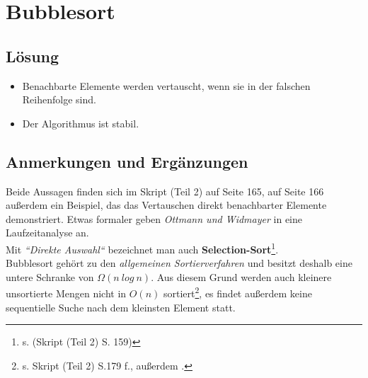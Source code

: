 \chapter{Bubblesort}

\section*{Lösung}

\begin{itemize}
    \item Benachbarte Elemente werden vertauscht, wenn sie in der falschen Reihenfolge sind.
    \item Der Algorithmus ist stabil.
\end{itemize}



\section*{Anmerkungen und Ergänzungen}

Beide Aussagen finden sich im Skript (Teil 2) auf Seite 165, auf Seite 166 außerdem ein Beispiel, das das Vertauschen direkt benachbarter Elemente demonstriert.
Etwas formaler geben \textit{Ottmann und Widmayer} in \cite[89 ff.]{OW17b} eine Laufzeitanalyse an.
\\

Mit \textit{``Direkte Auswahl``} bezeichnet man auch \textbf{Selection-Sort}\footnote{ s. (Skript (Teil 2) S. 159)}.
\\

Bubblesort gehört zu den \textit{allgemeinen Sortierverfahren} und besitzt deshalb eine untere Schranke von $\Omega(n\ log\ n)$.
Aus diesem Grund werden auch kleinere unsortierte Mengen nicht in $O(n)$ sortiert\footnote{
s. Skript (Teil 2) S.179 f., außerdem \cite[153 ff.]{OW17b}.
}, es findet außerdem keine sequentielle Suche nach dem kleinsten Element statt.

